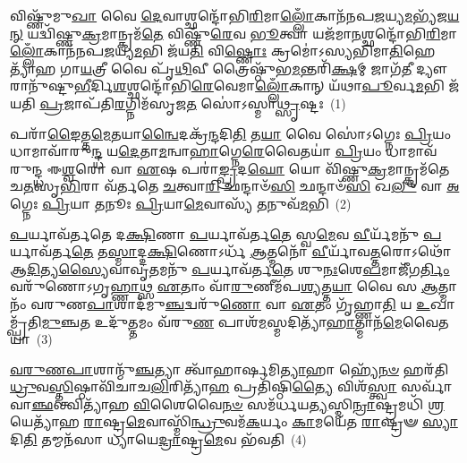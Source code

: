 \setcounter{anuvakam}{0}
𑌵𑌿𑌷𑍍𑌣𑍁᳴𑌮𑍁\-\ul{𑌖𑌾} 𑌵𑍈 \ul{𑌦𑍇}\-𑌵𑌾𑌶𑍍𑌛𑌨𑍍𑌦𑍋᳴𑌭𑌿\-\ul{𑌰𑌿}\-𑌮𑌾\-\ul{𑌲𑍍𑌲𑍋𑌁}\-𑌕𑌾𑌨᳴𑌨𑌪\-\ul{𑌜}\-𑌯𑍍𑌯\-\ul{𑌮}\-𑌭𑍍𑌯᳴𑌜\-\ul{𑌯}\-\-\ul{𑌨𑍍} 𑌯𑌦𑍍𑌵𑌿᳴𑌷𑍍𑌣𑍁\-\ul{𑌕𑍍𑌰}\-𑌮𑌾𑌨𑍍𑌕𑍍𑌰𑌮᳴\-\ul{𑌤𑍇} 𑌵𑌿𑌷𑍍𑌣𑍁᳴\-\ul{𑌰𑍇}\-𑌵 \ul{𑌭𑍂}\-𑌤𑍍𑌵𑌾 𑌯𑌜᳴𑌮𑌾\-\ul{𑌨}\-𑌶𑍍𑌛𑌨𑍍𑌦𑍋᳴𑌭𑌿\-\ul{𑌰𑌿}\-𑌮𑌾\-\ul{𑌲𑍍𑌲𑍋𑌁}\-𑌕𑌾𑌨᳴𑌨𑌪\-\ul{𑌜}\-𑌯𑍍𑌯\-\ul{𑌮}\-𑌭𑌿 𑌜᳴𑌯\-\ul{𑌤𑌿} 𑌵𑌿\-\ul{𑌷𑍍𑌣𑍋𑌃} 𑌕𑍍𑌰𑌮𑍋॑\-𑌽𑌸𑍍𑌯𑌭𑌿𑌮𑌾\-\ul{𑌤𑌿}\-𑌹𑍇𑌤𑍍𑌯𑌾᳴𑌹 𑌗𑌾\-\ul{𑌯}\-𑌤𑍍𑌰𑍀 𑌵𑍈 𑌪𑍃᳴\-\ul{𑌥𑌿}\-𑌵𑍀 𑌤𑍍𑌰𑍈𑌷𑍍𑌠𑍁᳴𑌭\-\ul{𑌮}\-𑌨𑍍𑌤𑌰𑌿᳴\-\ul{𑌕𑍍𑌷}\-𑌮𑍍 𑌜𑌾𑌗᳴\-\ul{𑌤𑍀} 𑌦𑍍𑌯𑍗𑌰𑌾𑌨𑍁᳴𑌷𑍍𑌟𑍁\-\ul{𑌭𑍀}\-𑌰𑍍𑌦𑌿\-\ul{𑌶}\-𑌶𑍍𑌛𑌨𑍍𑌦𑍋᳴𑌭𑌿\-\ul{𑌰𑍇}\-𑌵𑍇𑌮𑌾\-\ul{𑌲𑍍𑌲𑍋𑌁}\-𑌕𑌾𑌨𑍍 𑌯᳴𑌥𑌾\-\ul{𑌪𑍂}\-𑌰𑍍𑌵\-\ul{𑌮}\-𑌭𑌿 𑌜᳴𑌯𑌤𑌿 \ul{𑌪𑍍𑌰}\-𑌜𑌾𑌪᳴𑌤𑌿\-\ul{𑌰}\-𑌗𑍍𑌨𑌿𑌮᳴𑌸𑍃𑌜\-\ul{𑌤} 𑌸𑍋॑\-𑌽𑌸𑍍𑌮𑌾\-\ul{𑌥𑍍𑌸𑍃}\-𑌷𑍍𑌟𑌃~(1)

𑌪𑌰𑌾᳴\-\ul{𑌙𑍈}\-𑌤𑍍𑌤\-\ul{𑌮𑍇}\-𑌤𑌯𑌾\-\ul{𑌨𑍍𑌵𑍈}\-𑌦𑌕𑍍𑌰᳴\-\ul{𑌨𑍍𑌦}\-𑌦𑌿\-\ul{𑌤𑌿} 𑌤\-\ul{𑌯𑌾} 𑌵𑍈 𑌸𑍋॑\-𑌽𑌗𑍍𑌨𑍇𑌃 \ul{𑌪𑍍𑌰𑌿}\-𑌯𑌂 𑌧𑌾𑌮𑌾𑌵𑌾᳴𑌰𑍁\-\ul{𑌨𑍍𑌦𑍍𑌧} 𑌯\-\ul{𑌦𑍇}\-𑌤𑌾\-\ul{𑌮}\-𑌨𑍍𑌵𑌾\-\ul{𑌹𑌾}\-𑌗𑍍𑌨𑍇\-\ul{𑌰𑍇}\-𑌵𑍈𑌤𑌯𑌾॑ \ul{𑌪𑍍𑌰𑌿}\-𑌯𑌂 𑌧𑌾𑌮𑌾𑌵᳴ 𑌰𑍁𑌨𑍍𑌦𑍍𑌧 𑌈\-\ul{𑌶𑍍𑌵}\-𑌰𑍋 𑌵𑌾 \ul{𑌏}\-𑌷 𑌪𑌰𑌾॑\-\ul{𑌙𑍍𑌪𑍍𑌰}\-𑌦\-\ul{𑌘𑍋} 𑌯𑍋 𑌵𑌿᳴𑌷𑍍𑌣𑍁\-\ul{𑌕𑍍𑌰}\-𑌮𑌾𑌨𑍍𑌕𑍍𑌰𑌮᳴𑌤𑍇 𑌚\-\ul{𑌤}\-𑌸𑍃\-\ul{𑌭𑌿}\-𑌰𑌾 𑌵᳴𑌰𑍍𑌤𑌤𑍇 \ul{𑌚}\-𑌤𑍍𑌵𑌾\-\ul{𑌰𑌿} 𑌛𑌨𑍍𑌦𑌾𑍞᳴\-\ul{𑌸𑌿} 𑌛𑌨𑍍𑌦𑌾𑍞᳴\-\ul{𑌸𑌿} 𑌖\-\ul{𑌲𑍁} 𑌵𑌾 \ul{𑌅}\-𑌗𑍍𑌨𑍇𑌃 \ul{𑌪𑍍𑌰𑌿}\-𑌯𑌾 \ul{𑌤}\-𑌨𑍂𑌃 \ul{𑌪𑍍𑌰𑌿}\-𑌯𑌾\-\ul{𑌮𑍇}\-𑌵𑌾𑌸𑍍𑌯᳴ \ul{𑌤}\-𑌨𑍁𑌵᳴\-\ul{𑌮}\-𑌭𑌿~(2)

\-\ul{𑌪}\-𑌰𑍍𑌯𑌾𑌵᳴𑌰𑍍𑌤𑌤𑍇 𑌦\-\ul{𑌕𑍍𑌷𑌿}\-𑌣𑌾 \ul{𑌪}\-𑌰𑍍𑌯𑌾𑌵᳴𑌰𑍍𑌤\-\ul{𑌤𑍇} 𑌸𑍍𑌵\-\ul{𑌮𑍇}\-𑌵 \ul{𑌵𑍀}\-𑌰𑍍𑌯᳴𑌮𑌨𑍁᳴ \ul{𑌪}\-𑌰𑍍𑌯𑌾𑌵᳴𑌰𑍍𑌤\-\ul{𑌤𑍇} 𑌤\-\ul{𑌸𑍍𑌮𑌾}\-𑌦𑍍𑌦\-\ul{𑌕𑍍𑌷𑌿}\-𑌣𑍋\-𑌽𑌰𑍍𑌧᳴ \ul{𑌆}\-𑌤𑍍𑌮𑌨𑍋᳴ \ul{𑌵𑍀}\-𑌰𑍍𑌯𑌾᳴𑌵\-\ul{𑌤𑍍𑌤}\-𑌰𑍋\-𑌽𑌥𑍋᳴ 𑌆\-\ul{𑌦𑌿}\-𑌤𑍍𑌯\-\ul{𑌸𑍍𑌯𑍈}\-𑌵𑌾𑌵𑍃\-\ul{𑌤}\-𑌮𑌨𑍁᳴ \ul{𑌪}\-𑌰𑍍𑌯𑌾𑌵᳴𑌰𑍍𑌤\-\ul{𑌤𑍇} 𑌶𑍁\-\ul{𑌨𑌃}\-𑌶𑍇\-\ul{𑌪}\-𑌮𑌾𑌜𑍀᳴𑌗\-\ul{𑌰𑍍𑌤𑌿𑌂} 𑌵𑌰𑍁᳴𑌣𑍋\-𑌽𑌗𑍃\-\ul{𑌹𑍍𑌣𑌾}\-𑌥𑍍𑌸 \ul{𑌏}\-𑌤𑌾𑌂 𑌵𑌾᳴\-\ul{𑌰𑍁}\-𑌣𑍀𑌮᳴𑌪\-\ul{𑌶𑍍𑌯}\-𑌤𑍍𑌤\-\ul{𑌯𑌾} 𑌵𑍈 𑌸 \ul{𑌆}\-𑌤𑍍𑌮𑌾𑌨𑌂᳴ 𑌵𑌰𑍁𑌣\-\ul{𑌪𑌾}\-𑌶𑌾𑌦᳴𑌮𑍁\-\ul{𑌞𑍍𑌚}\-𑌦𑍍𑌵𑌰𑍁᳴\-\ul{𑌣𑍋} 𑌵𑌾 \ul{𑌏}\-𑌤𑌂 𑌗𑍃᳴𑌹𑍍𑌣𑌾\-\ul{𑌤𑌿} 𑌯 \ul{𑌉}\-𑌖𑌾𑌮𑍍𑌪𑍍𑌰᳴𑌤𑌿\-\ul{𑌮𑍁}\-𑌞𑍍𑌚\-\ul{𑌤} 𑌉𑌦𑍁᳴\-\ul{𑌤𑍍𑌤}\-𑌮𑌂 𑌵᳴𑌰𑍁\-\ul{𑌣} 𑌪𑌾𑌶᳴\-\ul{𑌮}\-𑌸𑍍𑌮𑌦𑌿𑌤𑍍𑌯𑌾᳴\-\ul{𑌹𑌾}\-𑌤𑍍𑌮𑌾𑌨᳴\-\ul{𑌮𑍇}\-𑌵𑍈𑌤𑌯𑌾॑~(3)

\-\ul{𑌵}\-\-\ul{𑌰𑍁}\-\-\ul{𑌣}\-\-\ul{𑌪𑌾}\-𑌶𑌾𑌨𑍍𑌮𑍁᳴\-\ul{𑌞𑍍𑌚}\-𑌤𑍍𑌯𑌾 𑌤𑍍𑌵𑌾᳴𑌹𑌾𑌰𑍍\mbox{}\-\ul{𑌷}\-𑌮𑌿\-\ul{𑌤𑍍𑌯𑌾}\-𑌹𑌾 𑌹𑍍𑌯𑍇᳴\-\ul{𑌨}\-\-\ul{𑍞} 𑌹𑌰᳴𑌤𑌿 \ul{𑌧𑍍𑌰𑍁}\-𑌵\-\ul{𑌸𑍍𑌤𑌿}\-𑌷𑍍𑌠𑌾𑌵𑌿᳴𑌚𑌾𑌚\-\ul{𑌲𑌿}\-𑌰𑌿𑌤𑍍𑌯𑌾᳴\-\ul{𑌹} 𑌪𑍍𑌰𑌤𑌿᳴𑌷𑍍𑌠𑌿\-\ul{𑌤𑍍𑌯𑍈} 𑌵𑌿𑌶᳴\-\ul{𑌸𑍍𑌤𑍍𑌵𑌾} 𑌸𑌰𑍍𑌵𑌾᳴ 𑌵𑌾\-\ul{𑌞𑍍𑌛}\-𑌨𑍍𑌤𑍍𑌵𑌿𑌤𑍍𑌯𑌾᳴𑌹 \ul{𑌵𑌿}\-𑌶𑍈𑌵𑍈\-\ul{𑌨}\-\-\ul{𑍞} 𑌸𑌮᳴𑌰𑍍𑌧𑌯\-\ul{𑌤𑍍𑌯}\-𑌸𑍍𑌮𑌿\-\ul{𑌨𑍍𑌰𑌾}\-𑌷𑍍𑌟𑍍𑌰𑌮𑌧𑌿᳴ \ul{𑌶𑍍𑌰}\-𑌯𑍇𑌤𑍍𑌯𑌾᳴𑌹 \ul{𑌰𑌾}\-𑌷𑍍𑌟𑍍𑌰\-\ul{𑌮𑍇}\-𑌵𑌾𑌸𑍍𑌮𑌿᳴\-\ul{𑌨𑍍𑌧𑍍𑌰𑍁}\-𑌵𑌮᳴\-\ul{𑌕}\-𑌰𑍍𑌯𑌂 \ul{𑌕𑌾}\-𑌮𑌯𑍇᳴𑌤 \ul{𑌰𑌾}\-𑌷𑍍𑌟𑍍𑌰𑍟 \ul{𑌸𑍍𑌯𑌾}\-𑌦𑌿\-\ul{𑌤𑌿} 𑌤𑌮𑍍𑌮𑌨᳴𑌸𑌾 𑌧𑍍𑌯𑌾𑌯𑍇\-\ul{𑌦𑍍𑌰𑌾}\-𑌷𑍍𑌟𑍍𑌰\-\ul{𑌮𑍇}\-𑌵 𑌭᳴𑌵𑌤𑌿~(4)

